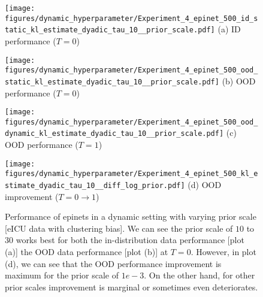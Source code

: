 \begin{figure}[h]
\centering
\begin{minipage}[b]{0.24\textwidth}
\centering
\texttt{[image: figures/dynamic\_hyperparameter/Experiment\_4\_epinet\_500\_id\_static\_kl\_estimate\_dyadic\_tau\_10\_\_prior\_scale.pdf]}
{\small{{(a)} ID performance ($T=0$) }}
\end{minipage}
\hfill
\begin{minipage}[b]{0.24\textwidth}
\centering \texttt{[image: figures/dynamic\_hyperparameter/Experiment\_4\_epinet\_500\_ood\_static\_kl\_estimate\_dyadic\_tau\_10\_\_prior\_scale.pdf]}
{\small{{(b)} OOD performance ($T=0$) }}
\end{minipage}
\hfill
\begin{minipage}[b]{0.24\textwidth}
\centering \texttt{[image: figures/dynamic\_hyperparameter/Experiment\_4\_epinet\_500\_ood\_dynamic\_kl\_estimate\_dyadic\_tau\_10\_\_prior\_scale.pdf]}
{\small{{(c)} OOD performance ($T=1$) }}
\end{minipage}
\hfill
\begin{minipage}[b]{0.24\textwidth}
\centering \texttt{[image: figures/dynamic\_hyperparameter/Experiment\_4\_epinet\_500\_kl\_estimate\_dyadic\_tau\_10\_\_diff\_log\_prior.pdf]}
{\small{{(d)} OOD improvement ($T=0 \to 1$) }}
\end{minipage}
\caption{Performance of epinets in a dynamic setting with varying prior scale [eICU data with clustering bias]. We can see the prior scale of $10$ to $30$ works best for both the in-distribution data performance [plot (a)]  the OOD data performance [plot (b)] at $T=0$. However, in plot (d), we can see that the OOD performance improvement is maximum for the prior scale of $1e-3$. 
On the other hand, for other prior scales improvement is marginal or sometimes even deteriorates.
}
\label{fig:Epinet_prior_scale}
\end{figure}



